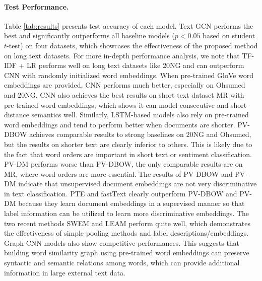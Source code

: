 \documentclass[letterpaper]{article} \usepackage{aaai19}  \usepackage{times}  \usepackage{helvet}  \usepackage{courier}  \usepackage{url}  \usepackage{graphicx}  \frenchspacing  \usepackage{amsmath}
\begin{document}
\paragraph{Test Performance.}
Table \ref{tab:results} presents test accuracy of each model. Text GCN performs the best and significantly outperforms all baseline models ($p < 0.05$ based on student $t$-test) on four datasets, which showcases the effectiveness of the proposed method on long text datasets. For more in-depth performance analysis, we note that TF-IDF + LR performs well on long text datasets like 20NG and can outperform CNN with randomly initialized word embeddings. When pre-trained GloVe word embeddings are provided, CNN performs much better, especially on Ohsumed and 20NG. CNN also achieves the best results on short text dataset MR with pre-trained word embeddings, which shows it can model consecutive and short-distance semantics well. Similarly, LSTM-based models also rely on pre-trained word embeddings and tend to perform better when documents are shorter. PV-DBOW achieves comparable results to strong baselines on 20NG and Ohsumed, but the results on shorter text are clearly inferior to others. This is likely due to the fact that word orders are important in short text or sentiment classification. PV-DM performs worse than PV-DBOW, the only comparable results are on MR, where word orders are more essential. The results of PV-DBOW and PV-DM indicate that unsupervised document embeddings are not very discriminative in text classification. PTE and fastText clearly outperform PV-DBOW and PV-DM because they learn document embeddings in a supervised manner so that label information can be utilized to learn more discriminative embeddings. The two recent methods SWEM and LEAM perform quite well, which demonstrates the effectiveness of simple pooling methods and label descriptions/embeddings. Graph-CNN models also show competitive performances. This suggests that building word similarity graph using pre-trained word embeddings can preserve syntactic and semantic relations among words, which can provide additional information in large external text data. 
\end{document}
